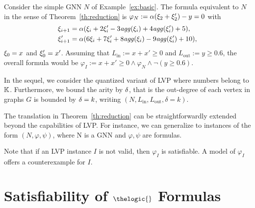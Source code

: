 \begin{example}
Consider the simple GNN $N$ of Example~\ref{ex:basic}.
The formula equivalent to $N$ in the sense of Theorem~\ref{th:reduction} is $\varphi_N := \alpha(\xi_{2}+ \xi_{2}') - y = 0$ with
\begin{align*}
    \xi_{i+1} & = \alpha(\xi_{i} + 2\xi_{i}' - 3\mathit{agg} (\xi_{i}) + 4\mathit{agg} (\xi_{i}') + 5), \\
    \xi_{i+1}' & = \alpha(6\xi_{i} + 7\xi_{i}' +8\mathit{agg}( \xi_{i}) -9\mathit{agg} (\xi_{i}') + 10),
\end{align*}
%
$\xi_0 = x$ and $\xi'_0 = x'$. Assuming that $L_{\text{in}} := x+x'\geq 0$ and
$L_{\text{out}} := y \geq 0.6$, the overall \thelogic{} formula would be
$\varphi_I := x+x'\geq 0 \land \varphi_N \land \lnot (y \geq 0.6)$.
\end{example}

In the sequel, we consider the quantized variant of LVP where numbers belong to $\mathbb K$. Furthermore, we bound the arity by $\delta$, that is the out-degree of each vertex in graphs $G$ is bounded by $\delta = k$, writing $(N, L_{\text{in}}, L_{\text{out}}, \delta = k)$.

\begin{remark}
The translation in Theorem~\ref{th:reduction} can be straightforwardly extended beyond the capabilities of LVP. For instance, we can generalize to instances of the form $(N, \varphi, \psi)$, where N is a GNN and $\varphi, \psi$ are \thelogic{} formulas.
\end{remark}



Note that if an LVP instance $I$ is not valid, then  $\varphi_I$ is satisfiable. A model of $\varphi_I$ offers a counterexample for $I$.



\section{Satisfiability of $\thelogic{}$ Formulas}
\label{sec:tableau}



